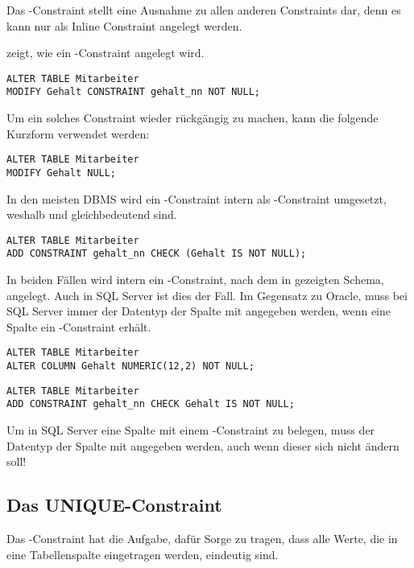 \begin{merke}
    Das \NOTNULL-Constraint stellt eine Ausnahme zu allen anderen Constraints dar, denn es kann nur als Inline Constraint angelegt werden.
\end{merke}
 zeigt, wie ein \NOTNULL-Constraint angelegt wird.
\begin{lstlisting}[language=oracle_sql,caption={Ein \NOTNULL-Constraint anlegen in Oracle},label=sql09_05]
ALTER TABLE Mitarbeiter
MODIFY Gehalt CONSTRAINT gehalt_nn NOT NULL;
        \end{lstlisting}
Um ein solches Constraint wieder rückgängig zu machen, kann die folgende Kurzform verwendet werden:
\begin{lstlisting}[language=oracle_sql,caption={Das Gegenteil von \NOTNULL},label=sql09_06]
ALTER TABLE Mitarbeiter
MODIFY Gehalt NULL;
        \end{lstlisting}
In den meisten DBMS wird ein \NOTNULL-Constraint intern als
\CHECK-Constraint umgesetzt, weshalb  und
 gleichbedeutend sind.
\begin{lstlisting}[language=oracle_sql,caption={Die alternative Form eines \NOTNULL-Constraints in Oracle},label=sql09_07]
ALTER TABLE Mitarbeiter
ADD CONSTRAINT gehalt_nn CHECK (Gehalt IS NOT NULL);
        \end{lstlisting}
In beiden Fällen wird intern ein \CHECK-Constraint, nach dem in  gezeigten Schema, angelegt. Auch in SQL Server ist dies der Fall. Im Gegensatz zu Oracle, muss bei SQL Server immer der Datentyp der Spalte mit angegeben werden, wenn eine Spalte ein \NOTNULL-Constraint erhält.
\begin{lstlisting}[language=ms_sql,caption={Ein \NOTNULL{} Constraint
anlegen in SQL Server},label=sql09_08]
ALTER TABLE Mitarbeiter
ALTER COLUMN Gehalt NUMERIC(12,2) NOT NULL;
        \end{lstlisting}
\begin{lstlisting}[language=ms_sql,caption={Die alternative Form eines
\NOTNULL{} Constraints in SQL Server},label=sql09_09]
ALTER TABLE Mitarbeiter
ADD CONSTRAINT gehalt_nn CHECK Gehalt IS NOT NULL;
        \end{lstlisting}
\begin{merke}
    Um in SQL Server eine Spalte mit einem \NOTNULL-Constraint zu belegen, muss der Datentyp der Spalte mit angegeben werden, auch wenn dieser sich nicht ändern soll!
\end{merke}
\subsection{Das UNIQUE-Constraint}
Das \UNIQUE-Constraint hat die Aufgabe, dafür Sorge zu tragen, dass alle Werte, die in eine Tabellenspalte eingetragen werden, eindeutig sind.

